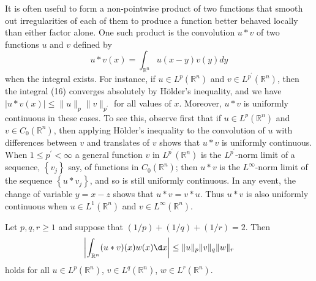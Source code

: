 \begin{para}
  It is often useful to form a non-pointwise product of two functions that smooth out irregularities of each of them to produce a function better behaved locally than either factor alone. One such product is the convolution $u * v$ of two functions $u$ and $v$ defined by
  \begin{equation}\label{eq:2.16}
    u * v(x)=\int_{\mathbb{R}^n} u(x-y) v(y) d y
  \end{equation}
  when the integral exists. For instance, if $u \in L^p(\mathbb{R}^n)$ and $v \in L^{p^{\prime}}(\mathbb{R}^n)$, then the integral (16) converges absolutely by Hölder's inequality, and we have $|u * v(x)| \leq\|u\|_p\|v\|_{p^{\prime}}$ for all values of $x$. Moreover, $u * v$ is uniformly continuous in these cases. To see this, observe first that if $u \in L^p(\mathbb{R}^n)$ and $v \in C_0(\mathbb{R}^n)$, then applying Hölder's inequality to the convolution of $u$ with differences between $v$ and translates of $v$ shows that $u * v$ is uniformly continuous. When $1 \leq p^{\prime}<\infty$ a general function $v$ in $L^{p^{\prime}}(\mathbb{R}^n)$ is the $L^{p^{\prime}}$-norm limit of a sequence, $\left\{v_j\right\}$ say, of functions in $C_0(\mathbb{R}^n)$; then $u * v$ is the $L^{\infty}$-norm limit of the sequence $\left\{u * v_j\right\}$, and so is still uniformly continuous. In any event, the change of variable $y=x-z$ shows that $u * v=v * u$. Thus $u * v$ is also uniformly continuous when $u \in L^1(\mathbb{R}^n)$ and $v \in L^{\infty}(\mathbb{R}^n)$.
\end{para}


\begin{theorem}
  Let $p, q, r \geq 1$ and suppose that $(1 / p)+(1 / q)+(1 / r)=2$. Then
  \[
  \left|\int_{\mathbb{R}^n}(u * v)(x) w(x) \d x\right| \leq\|u\|_p\|v\|_q\|w\|_r
  \]
  holds for all $u \in L^p(\mathbb{R}^n)$,
  $v \in L^q(\mathbb{R}^n)$, $w \in L^r(\mathbb{R}^n)$.
\end{theorem}

